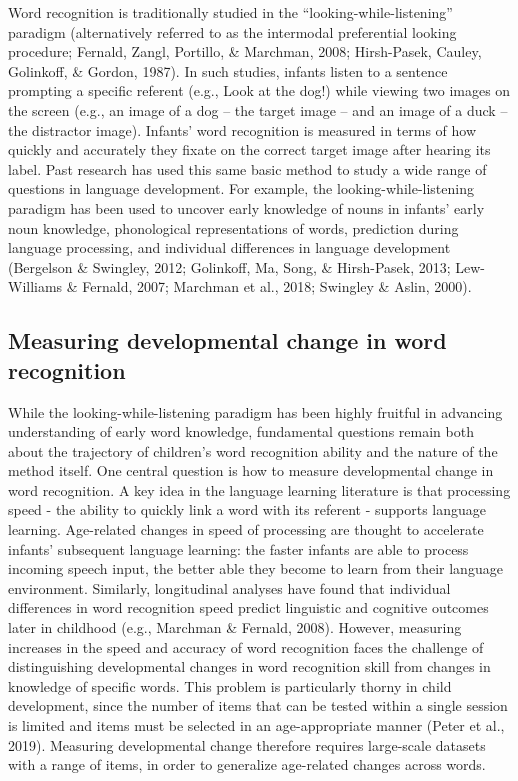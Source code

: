 \documentclass[
  english,
  man,floatsintext]{apa6}
\begin{document}
Word recognition is traditionally studied in the ``looking-while-listening'' paradigm (alternatively referred to as the intermodal preferential looking procedure; Fernald, Zangl, Portillo, \& Marchman, 2008; Hirsh-Pasek, Cauley, Golinkoff, \& Gordon, 1987).
In such studies, infants listen to a sentence prompting a specific referent (e.g., Look at the dog!) while viewing two images on the screen (e.g., an image of a dog -- the target image -- and an image of a duck -- the distractor image).
Infants' word recognition is measured in terms of how quickly and accurately they fixate on the correct target image after hearing its label.
Past research has used this same basic method to study a wide range of questions in language development.
For example, the looking-while-listening paradigm has been used to uncover early knowledge of nouns in infants' early noun knowledge, phonological representations of words, prediction during language processing, and individual differences in language development (Bergelson \& Swingley, 2012; Golinkoff, Ma, Song, \& Hirsh-Pasek, 2013; Lew-Williams \& Fernald, 2007; Marchman et al., 2018; Swingley \& Aslin, 2000).

\hypertarget{measuring-developmental-change-in-word-recognition}{%
\subsection{Measuring developmental change in word recognition}\label{measuring-developmental-change-in-word-recognition}}

While the looking-while-listening paradigm has been highly fruitful in advancing understanding of early word knowledge, fundamental questions remain both about the trajectory of children's word recognition ability and the nature of the method itself.
One central question is how to measure developmental change in word recognition.
A key idea in the language learning literature is that processing speed - the ability to quickly link a word with its referent - supports language learning.
Age-related changes in speed of processing are thought to accelerate infants' subsequent language learning: the faster infants are able to process incoming speech input, the better able they become to learn from their language environment.
Similarly, longitudinal analyses have found that individual differences in word recognition speed predict linguistic and cognitive outcomes later in childhood (e.g., Marchman \& Fernald, 2008).
However, measuring increases in the speed and accuracy of word recognition faces the challenge of distinguishing developmental changes in word recognition skill from changes in knowledge of specific words.
This problem is particularly thorny in child development, since the number of items that can be tested within a single session is limited and items must be selected in an age-appropriate manner (Peter et al., 2019).
Measuring developmental change therefore requires large-scale datasets with a range of items, in order to generalize age-related changes across words.
\end{document}
